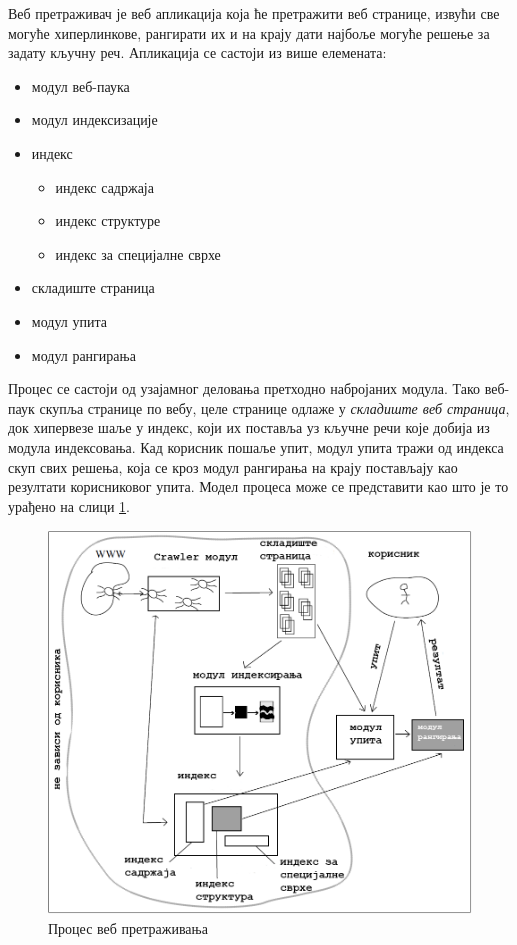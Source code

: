 \documentclass[11pt, serbianc, english, titlepage]{article}
\begin{document}
Веб претраживач је веб апликација која ће претражити веб странице, извући све могуће хиперлинкове, рангирати их и на крају дати најбоље могуће решење за задату кључну реч. Апликација се састоји из више елемената:
\begin{itemize}
\item модул веб-паука
\item модул индексизације
\item индекс
      \begin{itemize}
      \item индекс садржаја
      \item индекс структуре
      \item индекс за специјалне сврхе 
      \end{itemize}
\item складиште страница
\item модул упита
\item модул рангирања

\end{itemize}

Процес се састоји од узајамног деловања претходно набројаних модула. Тако веб-паук скупља странице по вебу, целе странице одлаже у \emph{складиште веб страница}, док хипервезе шаље у индекс, који их поставља уз кључне речи које добија из модула индексовања. Кад корисник пошаље упит, модул упита тражи од индекса скуп свих решења, која се кроз модул рангирања на крају постављају као резултати корисниковог упита. Модел процеса може се представити као што је то урађено на слици  \ref{slike:crawling}.
\begin{figure}
\centering
\includegraphics[scale=0.5]{crawling.png}
\caption{Процес веб претраживања \cite[Ch 1.3.2]{langville2011google}}
\label{slike:crawling}
\end{figure}
\end{document}
